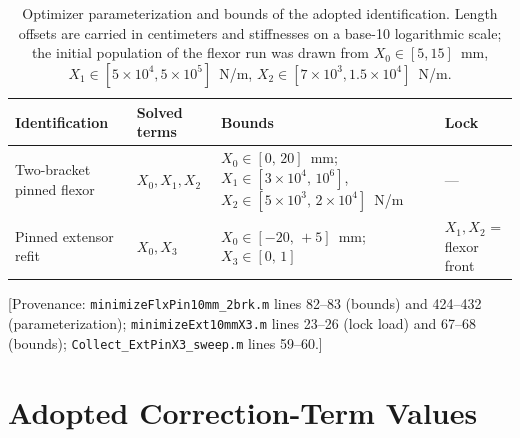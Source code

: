\begin{table}[htbp]
\caption{Optimizer parameterization and bounds of the adopted identification. Length offsets are carried in centimeters and stiffnesses on a base-10 logarithmic scale; the initial population of the flexor run was drawn from $X_{0}\in[5,15]$~mm, $X_{1}\in[5\times10^{4}, 5\times10^{5}]$~N/m, $X_{2}\in[7\times10^{3}, 1.5\times10^{4}]$~N/m.}
\label{tab:app_opt_bounds}
\begin{tabular}{@{}llll@{}}
\toprule
\textbf{Identification} & \textbf{Solved terms} & \textbf{Bounds} & \textbf{Lock} \\
\midrule
Two-bracket pinned flexor & $X_{0}, X_{1}, X_{2}$ & $X_{0}\in[0,\,20]$~mm; $X_{1}\in[3\times10^{4},\,10^{6}]$, $X_{2}\in[5\times10^{3},\,2\times10^{4}]$~N/m & --- \\
Pinned extensor refit & $X_{0}, X_{3}$ & $X_{0}\in[-20,\,+5]$~mm; $X_{3}\in[0,\,1]$ & $X_{1}, X_{2}$ = flexor front \\
\bottomrule
\end{tabular}
\end{table}

[Provenance: \texttt{minimizeFlxPin10mm\_2brk.m} lines 82--83 (bounds) and 424--432 (parameterization); \texttt{minimizeExt10mmX3.m} lines 23--26 (lock load) and 67--68 (bounds); \texttt{Collect\_ExtPinX3\_sweep.m} lines 59--60.]

\section{Adopted Correction-Term Values}

